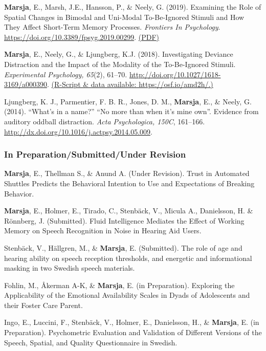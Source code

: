 \documentclass[]{article}
\begin{document}
\textbf{Marsja}, E., Marsh, J.E., Hansson, P., \& Neely, G. (2019).
Examining the Role of Spatial Changes in Bimodal and Uni-Modal
To-Be-Ignored Stimuli and How They Affect Short-Term Memory Processes.
\emph{Frontiers In Psychology}.
\url{https://doi.org/10.3389/fpsyg.2019.00299}.
\href{https://bit.ly/3LkKD19}{(PDF)}

\textbf{Marsja}, E., Neely, G., \& Ljungberg, K.J. (2018). Investigating
Deviance Distraction and the Impact of the Modality of the To-Be-Ignored
Stimuli. \emph{Experimental Psychology, 65}(2), 61--70.
\url{http://doi.org/10.1027/1618-3169/a000390}.
\href{https://osf.io/amd2h/}{(R-Script \& data available:
https://osf.io/amd2h/.)}

Ljungberg, K. J., Parmentier, F. B. R., Jones, D. M., \textbf{Marsja},
E., \& Neely, G. (2014). ``What's in a name?'' ``No more than when it's
mine own''. Evidence from auditory oddball distraction. \emph{Acta
Psychologica, 150C}, 161--166.
\href{http://doi.org/10.1027/1618-3169/a000390}{http://dx.doi.org/10.1016/j.actpsy.2014.05.009}.

\subsubsection{In Preparation/Submitted/Under
Revision}\label{in-preparationsubmittedunder-revision}

\textbf{Marsja}, E., Thellman S., \& Anund A. (Under Revision). Trust in
Automated Shuttles Predicts the Behavioral Intention to Use and
Expectations of Breaking Behavior.

\textbf{Marsja}, E., Holmer, E., Tirado, C., Stenbäck, V., Micula A.,
Danielsson, H. \& Rönnberg, J. (Submitted). Fluid Intelligence Mediates
the Effect of Working Memory on Speech Recognition in Noise in Hearing
Aid Users.

Stenbäck, V., Hällgren, M., \& \textbf{Marsja}, E. (Submitted). The role
of age and hearing ability on speech reception thresholds, and energetic
and informational masking in two Swedish speech materials.

Fohlin, M., Åkerman A-K, \& \textbf{Marsja}, E. (in Preparation).
Exploring the Applicability of the Emotional Availability Scales in
Dyads of Adolescents and their Foster Care Parent.

Ingo, E., Luccini, F., Stenbäck, V., Holmer, E., Danielsson, H., \&
\textbf{Marsja}, E. (in Preparation). Psychometric Evaluation and
Validation of Different Versions of the Speech, Spatial, and Quality
Questionnaire in Swedish.
\end{document}
